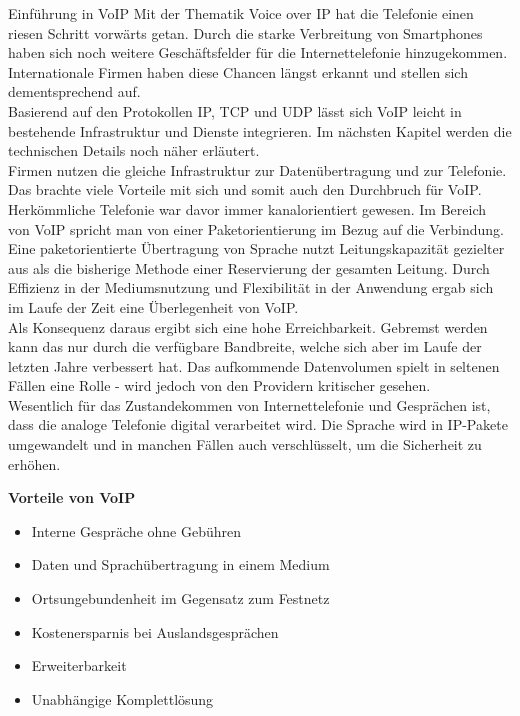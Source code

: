  \label{Einführung in VoIP}
 \begin{section}{Einführung in VoIP}
 	Mit der Thematik Voice over IP hat die Telefonie einen riesen Schritt vorwärts getan.
 	Durch die starke Verbreitung von Smartphones haben sich noch weitere Geschäftsfelder für 
 	die Internettelefonie hinzugekommen. Internationale Firmen haben diese Chancen längst erkannt 
 	und stellen sich dementsprechend auf. \\
 	Basierend auf den Protokollen \ac{IP}, \ac{TCP} und \ac{UDP} lässt sich VoIP leicht in bestehende 
 	Infrastruktur und Dienste integrieren.
 	Im nächsten Kapitel werden die technischen Details noch näher erläutert. \\
 	Firmen nutzen die gleiche Infrastruktur zur Datenübertragung und zur Telefonie.
 	Das brachte viele Vorteile mit sich und somit auch den Durchbruch für VoIP.
 	Herkömmliche Telefonie war davor immer kanalorientiert gewesen. 
 	Im Bereich von VoIP spricht man von einer Paketorientierung im Bezug 
 	auf die Verbindung. \\
	Eine paketorientierte Übertragung von Sprache nutzt Leitungskapazität 
	gezielter aus als die bisherige Methode einer Reservierung der gesamten Leitung.
	Durch Effizienz in der Mediumsnutzung und Flexibilität in der Anwendung ergab sich 
	im Laufe der Zeit eine Überlegenheit von VoIP. \\
	Als Konsequenz daraus ergibt sich eine hohe Erreichbarkeit.
	Gebremst werden kann das nur durch die verfügbare Bandbreite, welche sich 
	aber im Laufe der letzten Jahre verbessert hat. Das aufkommende Datenvolumen 
	spielt in seltenen Fällen eine Rolle - wird jedoch von den Providern kritischer 
	gesehen. \\
	Wesentlich für das Zustandekommen von Internettelefonie und Gesprächen ist, 
	dass die analoge Telefonie digital verarbeitet wird. 
	Die Sprache wird in IP-Pakete umgewandelt und in manchen Fällen auch verschlüsselt, 
	um die Sicherheit zu erhöhen.
	
 	
 	\textbf{Vorteile von VoIP}
 	\begin{itemize}
 		\item Interne Gespräche ohne Gebühren
 		\item Daten und Sprachübertragung in einem Medium
 		\item Ortsungebundenheit im Gegensatz zum Festnetz
 		\item Kostenersparnis bei Auslandsgesprächen
 		\item Erweiterbarkeit
 		\item Unabhängige Komplettlösung
 	\end{itemize}
 	

\end{section}
